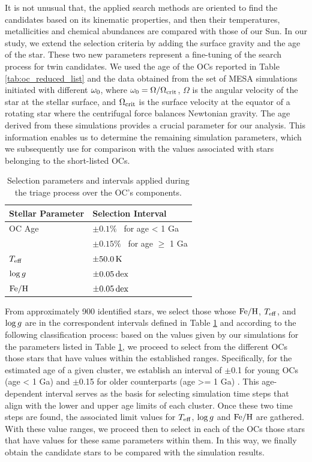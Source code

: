 \documentclass[fleqn,usenatbib]{mnras}
\begin{document}
It is not unusual that, the applied search methods are oriented to find the candidates based on its kinematic properties, and then their temperatures, metallicities and chemical abundances are compared with those of our Sun. In our study, we extend the selection criteria by adding the surface gravity and the age of the star. These two new parameters represent a fine-tuning of the search process for twin candidates. We used the age of the OCs reported in Table \ref{tab:oc_reduced_list} and the data obtained from the set of MESA simulations initiated with different $\omega_{\mathrm{0}}$, where $\omega_{\mathrm{0}} = \Omega / \Omega_{\mathrm{crit}}$, $\Omega$ is the angular velocity of the star at the stellar surface, and $\Omega_{\mathrm{crit}}$ is the surface velocity at the equator of a rotating star where the centrifugal force balances Newtonian gravity. The age derived from these simulations provides a crucial parameter for our analysis. This information enables us to determine the remaining simulation parameters, which we subsequently use for comparison with the values associated with stars belonging to the short-listed OCs.\par


\begin{table}
	\centering
	\begin{tabular}{ll} 
		\hline
		Stellar Parameter & Selection Interval\\
		\hline
        OC Age & $\pm0.1\%$ \, for age < 1 Ga \\
        & $\pm0.15\%$ \, for age $\geq$ 1 Ga \\
        $T_{\mathrm{eff}}$ & $\pm 50.0 \, \mathrm{K}$\\
        $\mathrm{log} \, g$ & $\pm 0.05 \, \mathrm{dex}$\\
        $\mathrm{Fe}/\mathrm{H}$ & $\pm 0.05 \, \mathrm{dex}$\\
		\hline
	\end{tabular}
    \caption{Selection parameters and intervals applied during the triage process over the OC's components.}
    \label{tab:sel_params}
\end{table}


From approximately 900 identified stars, we select those whose $\mathrm{Fe}/\mathrm{H}$, $T_{\mathrm{eff}}$, and $\mathrm{log} \, g$ are in the correspondent intervals defined in Table \ref{tab:sel_params} and according to the following classification process: based on the values given by our simulations for the parameters listed in Table \ref{tab:sel_params}, we proceed to select from the different OCs those stars that have values within the established ranges. Specifically, for the estimated age of a given cluster, we establish an interval of $\pm$0.1 for young OCs (age < 1 Ga) and $\pm$0.15 for older counterparts (age >= 1 Ga) \citep[refer to][for comprehensive reference values]{Cantat-Gaudin2020}. This age-dependent interval serves as the basis for selecting simulation time steps that align with the lower and upper age limits of each cluster. Once these two time steps are found, the associated limit values for $T_{\mathrm{eff}}$, $\mathrm{log} \, g$ and $\mathrm{Fe}/\mathrm{H}$ are gathered. With these value ranges, we proceed then to select in each of the OCs those stars that have values for these same parameters within them. In this way, we finally obtain the candidate stars to be compared with the simulation results.\par
\end{document}
